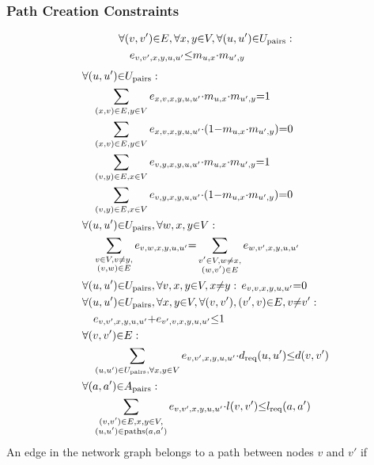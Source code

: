 \documentclass[10pt,a4paper,conference]{IEEEtran}
\begin{document}
\subsubsection{Path Creation Constraints}
{\footnotesize
\begin{align}
    & \forall (v,v') {\in} E, \forall x,y {\in} V, \forall (u,u') {\in} U_\text{pairs} : \notag\\
    &\quad e_{v,v',x,y,u,u'} {\leq} m_{u,x} {\cdot} m_{u',y} \label{constr:e}
\end{align}
\begin{align}
    & \forall (u,u') {\in} U_\text{pairs} : \notag\\ 
    &\quad \sum_{(x,v) {\in} E, y {\in} V} e_{x,v,x,y,u,u'} {\cdot} m_{u,x} {\cdot} m_{u',y} {=} 1 \label{constr:start} \\
    &\quad \sum_{(x,v) {\in} E, y {\in} V} e_{x,v,x,y,u,u'} {\cdot} (1 {-} m_{u,x} {\cdot} m_{u',y}) {=} 0 \label{constr:notstart} \\
    &\quad \sum_{(v,y) {\in} E, x {\in} V} e_{v,y,x,y,u,u'} {\cdot} m_{u,x} {\cdot} m_{u',y} {=} 1 \label{constr:end} \\
    &\quad \sum_{(v,y) {\in} E, x {\in} V} e_{v,y,x,y,u,u'} {\cdot} (1 {-} m_{u,x} {\cdot} m_{u',y}) {=} 0 \label{constr:notend}\\
    & \forall (u,u') {\in} U_\text{pairs}, \forall w,x,y {\in} V : \notag\\
    &\quad \sum_{\substack{v {\in} V, v {\neq} y, \\ (v,w) {\in} E}} e_{v,w,x,y,u,u'} {=} \sum_{\substack{v' {\in} V, w {\neq} x,\\ (w,v') {\in} E}} e_{w,v',x,y,u,u'} \label{constr:preserve} \\  
    & \forall (u,u') {\in} U_\text{pairs}, \forall v,x,y {\in} V, x {\neq} y : \, e_{v,v,x,y,u,u'} {=} 0 \label{constr:loop1} \\
    & \forall (u,u') {\in} U_\text{pairs}, \forall x,y {\in} V, \forall (v,v'), (v',v) {\in} E, v {\neq} v' : \notag\\
    &\quad e_{v,v',x,y,u,u'} {+} e_{v',v,x,y,u,u'} {\leq} 1 \label{constr:loop2} \\
    & \forall (v,v') {\in} E : \notag\\
    &\quad \sum_{(u,u') {\in} U_\text{pairs},  \forall x,y {\in} V} e_{v,v',x,y,u,u'} {\cdot} d_\text{req}(u,u') {\leq} d(v,v') \label{constr:e.dreq} \\
    & \forall (a,a') {\in} A_\text{pairs} : \notag\\
    &\quad \sum_{\substack{(v,v') {\in} E, x,y {\in} V, \\ (u,u') {\in} \text{paths}(a,a')}} e_{v,v',x,y,u,u'} {\cdot} l(v,v') {\leq} l_\text{req}(a,a') \label{constr:e.lreq}   
\end{align}
}An edge in the network graph belongs to a path between nodes $ v $ and $ v' $ if 
\end{document}
